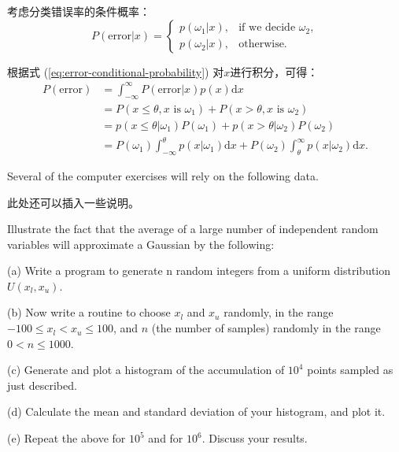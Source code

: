 \documentclass{hw}
\begin{document}
\begin{answer}
考虑分类错误率的条件概率：
\begin{equation}
	P(\text{error} | x) =
	\begin{cases}
		p(\omega_1 | x), & \text{if we decide }\omega_2, \\
		p(\omega_2 | x), & \text{otherwise.}
	\end{cases}
	\label{eq:error-conditional-probability}
\end{equation}

根据式 (\ref{eq:error-conditional-probability}) 对\(x\)进行积分，可得：
\begin{align}
	P(\text{error}) & = \int_{-\infty}^\infty P(\text{error} | x) p(x) \mathrm{d} x \\
	& = P(x \leq \theta , x \text{ is } \omega_1 ) + P(x > \theta , x \text{ is } \omega_2 ) \\
	& = p(x \leq \theta | \omega_1) P(\omega_1) + p(x > \theta | \omega_2) P(\omega_2) \\
	& = P\left(\omega_{1}\right) \int_{-\infty}^{\theta} p\left(x | \omega_{1}\right) \mathrm{d} x + P\left(\omega_{2}\right) \int_{\theta}^{\infty} p\left(x | \omega_{2}\right) \mathrm{d} x. \label{eq:error-probability}
\end{align}
\end{answer}

\makecomputerexercise

Several of the computer exercises will rely on the following data.

此处还可以插入一些说明。

\begin{computerexercise}
Illustrate the fact that the average of a large number of independent random variables will approximate a Gaussian by the following:

(a) Write a program to generate n random integers from a uniform distribution \(U(x_l, x_u)\).

(b) Now write a routine to choose \(x_l\) and \(x_u\) randomly, in the range \(-100 \leq x_l < x_u \leq 100\), and \(n\) (the number of samples) randomly in the range \(0 < n \leq 1000\).

(c) Generate and plot a histogram of the accumulation of \(10^4\) points sampled as just described.

(d) Calculate the mean and standard deviation of your histogram, and plot it.

(e) Repeat the above for \(10^5\) and for \(10^6\). Discuss your results.
\end{computerexercise}
\end{document}
